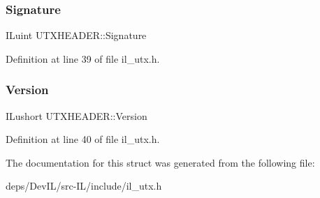 \subsubsection{\texorpdfstring{Signature}{Signature}}
{\footnotesize\ttfamily I\+Luint U\+T\+X\+H\+E\+A\+D\+E\+R\+::\+Signature}



Definition at line 39 of file il\+\_\+utx.\+h.

\mbox{\label{structUTXHEADER_ac464a68dd7c68d9aba1f42a318a7f6b1}} 
\subsubsection{\texorpdfstring{Version}{Version}}
{\footnotesize\ttfamily I\+Lushort U\+T\+X\+H\+E\+A\+D\+E\+R\+::\+Version}



Definition at line 40 of file il\+\_\+utx.\+h.



The documentation for this struct was generated from the following file\+:\begin{DoxyCompactItemize}
\item 
deps/\+Dev\+I\+L/src-\/\+I\+L/include/il\+\_\+utx.\+h\end{DoxyCompactItemize}

